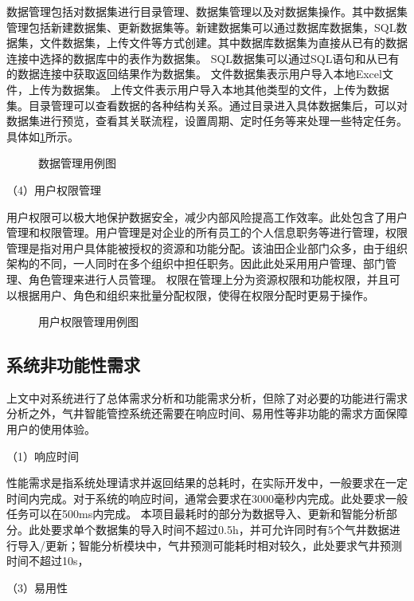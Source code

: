 数据管理包括对数据集进行目录管理、数据集管理以及对数据集操作。其中数据集管理包括新建数据集、更新数据集等。新建数据集可以通过数据库数据集，SQL数据集，文件数据集，上传文件等方式创建。其中数据库数据集为直接从已有的数据连接中选择的数据库中的表作为数据集。
SQL数据集可以通过SQL语句和从已有的数据连接中获取返回结果作为数据集。
文件数据集表示用户导入本地Excel文件，上传为数据集。
上传文件表示用户导入本地其他类型的文件，上传为数据集。目录管理可以查看数据的各种结构关系。通过目录进入具体数据集后，可以对数据集进行预览，查看其关联流程，设置周期、定时任务等来处理一些特定任务。具体如\ref{fig:datamaucase}所示。
\begin{figure}[H]
    \centering
    \caption{数据管理用例图}
    
    \label{fig:datamaucase}
\end{figure}



（4）用户权限管理

用户权限可以极大地保护数据安全，减少内部风险提高工作效率。此处包含了用户管理和权限管理。用户管理是对企业的所有员工的个人信息职务等进行管理，权限管理是指对用户具体能被授权的资源和功能分配。该油田企业部门众多，由于组织架构的不同，一人同时在多个组织中担任职务。因此此处采用用户管理、部门管理、角色管理来进行人员管理。
权限在管理上分为资源权限和功能权限，并且可以根据用户、角色和组织来批量分配权限，使得在权限分配时更易于操作。
\begin{figure}[H]
    \centering
    \caption{用户权限管理用例图}
    
\end{figure}
\subsection{系统非功能性需求}
上文中对系统进行了总体需求分析和功能需求分析，但除了对必要的功能进行需求分析之外，气井智能管控系统还需要在响应时间、易用性等非功能的需求方面保障用户的使用体验。

（1）响应时间

性能需求是指系统处理请求并返回结果的总耗时，在实际开发中，一般要求在一定时间内完成。对于系统的响应时间，通常会要求在3000毫秒内完成。此处要求一般任务可以在500ms内完成。
本项目最耗时的部分为数据导入、更新和智能分析部分。此处要求单个数据集的导入时间不超过0.5h，并可允许同时有5个气井数据进行导入/更新；智能分析模块中，气井预测可能耗时相对较久，此处要求气井预测时间不超过10s，


（3）易用性

